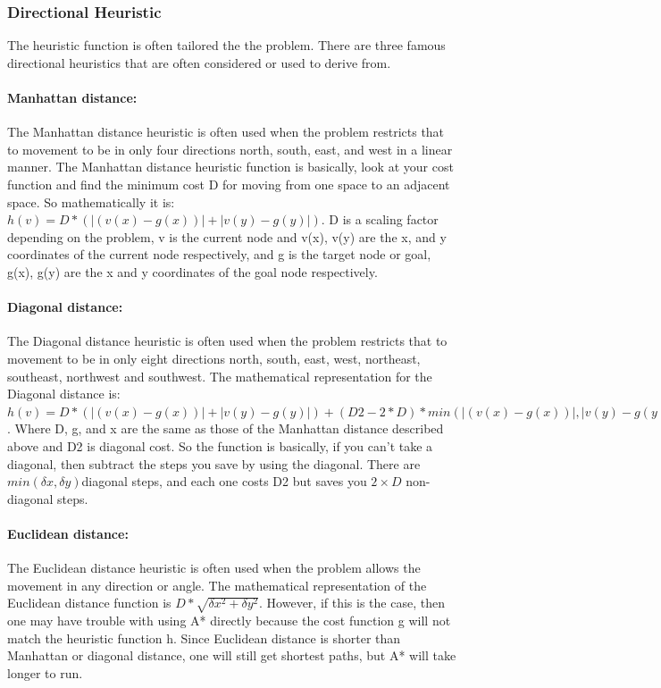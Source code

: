 \documentclass[12pt]{article}
\begin{document}
\subsubsection{Directional Heuristic}
The heuristic function is often tailored the the problem. There are three famous directional heuristics that are often considered or used to derive from.

\paragraph{Manhattan distance: }
 The Manhattan distance heuristic is often used when the problem restricts that to movement to be in only four directions north, south, east, and west in a linear manner. The Manhattan distance heuristic function is basically, look at your cost function and find the minimum cost D for moving from one space to an adjacent space. So mathematically it is: \begin{math} h(v) = D*(|(v(x) - g(x))| + |v(y) - g(y)|)\end{math}. D is a scaling factor depending on the problem, v is the current node and v(x), v(y) are the x, and y coordinates of the current node respectively, and g is the target node or goal, g(x), g(y) are the x and y coordinates of the goal node respectively.

\paragraph{Diagonal distance: }
The Diagonal distance heuristic is often used when the problem restricts that to movement to be in only eight directions north, south, east, west, northeast, southeast, northwest and southwest. The mathematical representation for the Diagonal distance is: \begin{math} h(v) = D*(|(v(x) - g(x))| + |v(y) - g(y)|) + (D2 - 2 * D) * min(|(v(x) - g(x))|, |v(y) - g(y)|)\end{math}. Where D, g, and x are the same as those of the Manhattan distance described above and D2 is diagonal cost. So the function is basically, if you can’t take a diagonal, then subtract the steps you save by using the diagonal. There are \begin{math} min(\delta x, \delta y) \end{math}diagonal steps, and each one costs D2 but saves you $2\times D$ non-diagonal steps.

\paragraph{Euclidean distance: }
The Euclidean distance heuristic is often used when the problem allows the movement in any direction or angle. The mathematical representation of the Euclidean distance function is \begin{math}D * \sqrt{\delta x^2 + \delta y^2}\end{math}. However, if this is the case, then one may have trouble with using A* directly because the cost function g will not match the heuristic function h. Since Euclidean distance is shorter than Manhattan or diagonal distance, one will still get shortest paths, but A* will take longer to run.
\end{document}
